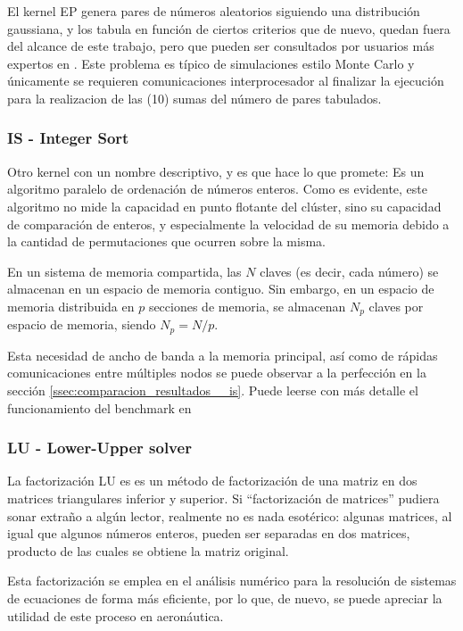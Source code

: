 El kernel EP genera pares de números aleatorios siguiendo una distribución gaussiana, y los tabula en función de ciertos criterios que de nuevo, quedan fuera del alcance de este trabajo, pero que pueden ser consultados por usuarios más expertos en \cite[2.2.1]{benchmarks1994technical}. Este problema es típico de simulaciones estilo Monte Carlo y únicamente se requieren comunicaciones interprocesador al finalizar la ejecución para la realizacion de las (10) sumas del número de pares tabulados. 

\subsubsection{IS - Integer Sort}
\label{sssec:benchmarks__is}
Otro kernel con un nombre descriptivo, y es que hace lo que promete: Es un algoritmo paralelo de ordenación de números enteros. Como es evidente, este algoritmo no mide la capacidad en punto flotante del clúster, sino su capacidad de comparación de enteros, y especialmente la velocidad de su memoria debido a la cantidad de permutaciones que ocurren sobre la misma.

En un sistema de memoria compartida, las $N$ claves (es decir, cada número) se almacenan en un espacio de memoria contiguo. Sin embargo, en un espacio de memoria distribuida en $p$ secciones de memoria, se almacenan $N_{p}$ claves por espacio de memoria, siendo $N_{p} = N / p$.

Esta necesidad de ancho de banda a la memoria principal, así como de rápidas comunicaciones entre múltiples nodos se puede observar a la perfección en la sección \ref{ssec:comparacion_resultados__is}. Puede leerse con más detalle el funcionamiento del benchmark en \cite[2.2.5]{benchmarks1994technical}

\subsubsection{LU - Lower-Upper solver}
\label{sssec:benchmarks__lu}
La factorización LU es es un método de factorización de una matriz en dos matrices triangulares inferior y superior. Si ``factorización de matrices'' pudiera sonar extraño a algún lector, realmente no es nada esotérico: algunas matrices, al igual que algunos números enteros, pueden ser separadas en dos matrices, producto de las cuales se obtiene la matriz original.

Esta factorización se emplea en el análisis numérico para la resolución de sistemas de ecuaciones de forma más eficiente, por lo que, de nuevo, se puede apreciar la utilidad de este proceso en aeronáutica.

